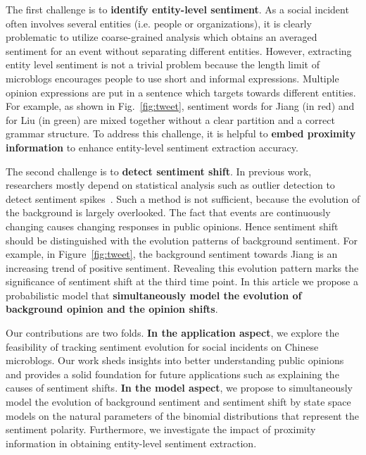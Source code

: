 \documentclass[runningheads]{llncs}
\begin{document}
The first challenge is to \textbf{identify entity-level sentiment}. 
As a social incident often involves several entities (i.e. people or organizations), it is clearly problematic to utilize coarse-grained analysis which obtains an averaged sentiment for an event without separating different entities. %
However, extracting entity level sentiment is not a trivial problem because the length limit of microblogs encourages people to use short and informal expressions.
Multiple opinion expressions are put in a sentence which targets towards different entities.
For example, as shown in Fig.~\ref{fig:tweet}, sentiment words for Jiang (in red) and for Liu (in green) are mixed together without a clear partition and a correct grammar structure. 
To address this challenge, it is helpful to \textbf{embed proximity information} to enhance entity-level sentiment extraction accuracy. 



The second challenge is to \textbf{detect sentiment shift}.
In previous work, researchers mostly depend on statistical analysis such as outlier detection to detect sentiment spikes~\cite{Giachanou2016sentichange,Giachanou2017sentichange,Giachanou2016sentitime}.
Such a method is not sufficient, because the evolution of the background is largely overlooked.
The fact that events are continuously changing causes changing responses in public opinions. Hence sentiment shift should be distinguished with the evolution patterns of background sentiment.  
For example, in Figure~\ref{fig:tweet}, the background sentiment towards Jiang is an increasing trend of positive sentiment. Revealing this evolution pattern marks the significance of sentiment shift at the third time point. %
In this article we propose a probabilistic model that \textbf{simultaneously model the evolution of background opinion and the opinion shifts}.

Our contributions are two folds. 
\textbf{In the application aspect}, we explore the feasibility of tracking sentiment evolution for social incidents on Chinese microblogs. Our work sheds insights into better understanding public opinions and provides a solid foundation for future applications such as explaining the causes of sentiment shifts. 
\textbf{In the model aspect}, we propose to simultaneously model the evolution of background sentiment and sentiment shift by state space models on the natural parameters of the binomial distributions that represent the sentiment polarity. 
Furthermore, we investigate the impact of proximity information in obtaining entity-level sentiment extraction.
\end{document}
